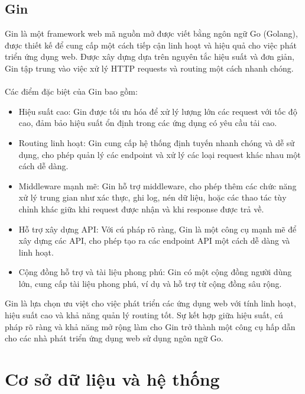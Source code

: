 \subsection{Gin}
Gin là một framework web mã nguồn mở được viết bằng ngôn ngữ Go (Golang), được thiết kế để cung cấp một cách tiếp cận linh hoạt và hiệu quả cho việc phát triển ứng dụng web. Được xây dựng dựa trên nguyên tắc hiệu suất và đơn giản, Gin tập trung vào việc xử lý HTTP requests và routing một cách nhanh chóng.\\
\\
Các điểm đặc biệt của Gin bao gồm:
\begin{itemize}
    \item Hiệu suất cao: Gin được tối ưu hóa để xử lý lượng lớn các request với tốc độ cao, đảm bảo hiệu suất ổn định trong các ứng dụng có yêu cầu tải cao.

    \item Routing linh hoạt: Gin cung cấp hệ thống định tuyến nhanh chóng và dễ sử dụng, cho phép quản lý các endpoint và xử lý các loại request khác nhau một cách dễ dàng.

    \item Middleware mạnh mẽ: Gin hỗ trợ middleware, cho phép thêm các chức năng xử lý trung gian như xác thực, ghi log, nén dữ liệu, hoặc các thao tác tùy chỉnh khác giữa khi request được nhận và khi response được trả về.

    \item Hỗ trợ xây dựng API: Với cú pháp rõ ràng, Gin là một công cụ mạnh mẽ để xây dựng các API, cho phép tạo ra các endpoint API một cách dễ dàng và linh hoạt.

    \item Cộng đồng hỗ trợ và tài liệu phong phú: Gin có một cộng đồng người dùng lớn, cung cấp tài liệu phong phú, ví dụ và hỗ trợ từ cộng đồng sâu rộng.
\end{itemize}
Gin là lựa chọn ưu việt cho việc phát triển các ứng dụng web với tính linh hoạt, hiệu suất cao và khả năng quản lý routing tốt. Sự kết hợp giữa hiệu suất, cú pháp rõ ràng và khả năng mở rộng làm cho Gin trở thành một công cụ hấp dẫn cho các nhà phát triển ứng dụng web sử dụng ngôn ngữ Go.
\section{Cơ sở dữ liệu và hệ thống}
